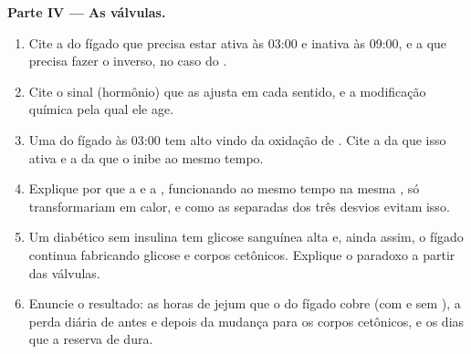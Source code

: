 \begin{problem}
\medskip
\noindent\textbf{Parte IV --- As válvulas.}
\begin{enumerate}[resume]
  \item Cite a  do fígado que precisa estar ativa às 03:00 e
        inativa às 09:00, e a que precisa fazer o inverso, no caso do
        .
  \item Cite o sinal (hormônio) que as ajusta em cada sentido, e a
        modificação química pela qual ele age.
  \item Uma  do fígado às 03:00 tem  alto vindo da
        oxidação de . Cite a  da  que isso
        ativa e a  da  que o  inibe ao mesmo tempo.
  \item Explique por que a  e a , funcionando ao
        mesmo tempo na mesma , só transformariam  em calor, e
        como as  separadas dos três desvios evitam isso.
  \item Um diabético sem insulina tem glicose sanguínea alta e, ainda
        assim, o fígado continua fabricando glicose e corpos cetônicos.
        Explique o paradoxo a partir das válvulas.
  \item Enuncie o resultado: as horas de jejum que o  do
        fígado cobre (com e sem ), a perda diária de
         antes e depois da mudança para os corpos cetônicos, e
        os dias que a reserva de  dura.
\end{enumerate}
\end{problem}
